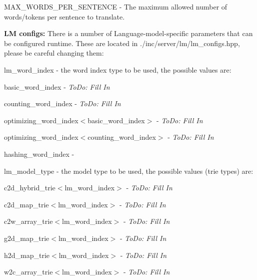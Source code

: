 \begin{DoxyItemize}
\item {\ttfamily M\+A\+X\+\_\+\+W\+O\+R\+D\+S\+\_\+\+P\+E\+R\+\_\+\+S\+E\+N\+T\+E\+N\+C\+E} -\/ The maximum allowed number of words/tokens per sentence to translate.
\end{DoxyItemize}

{\bfseries L\+M configs\+:} There is a number of Language-\/model-\/specific parameters that can be configured runtime. These are located in {\ttfamily ./inc/server/lm/lm\+\_\+configs.hpp}, please be careful changing them\+:


\begin{DoxyItemize}
\item {\ttfamily lm\+\_\+word\+\_\+index} -\/ the word index type to be used, the possible values are\+:
\begin{DoxyItemize}
\item {\ttfamily basic\+\_\+word\+\_\+index} -\/ {\itshape To\+Do\+: Fill In}
\item {\ttfamily counting\+\_\+word\+\_\+index} -\/ {\itshape To\+Do\+: Fill In}
\item {\ttfamily optimizing\+\_\+word\+\_\+index$<$basic\+\_\+word\+\_\+index$>$} -\/ {\itshape To\+Do\+: Fill In}
\item {\ttfamily optimizing\+\_\+word\+\_\+index$<$counting\+\_\+word\+\_\+index$>$} -\/ {\itshape To\+Do\+: Fill In}
\item {\ttfamily hashing\+\_\+word\+\_\+index} -\/
\end{DoxyItemize}
\item {\ttfamily lm\+\_\+model\+\_\+type} -\/ the model type to be used, the possible values (trie types) are\+:
\begin{DoxyItemize}
\item {\ttfamily c2d\+\_\+hybrid\+\_\+trie$<$lm\+\_\+word\+\_\+index$>$} -\/ {\itshape To\+Do\+: Fill In}
\item {\ttfamily c2d\+\_\+map\+\_\+trie$<$lm\+\_\+word\+\_\+index$>$} -\/ {\itshape To\+Do\+: Fill In}
\item {\ttfamily c2w\+\_\+array\+\_\+trie$<$lm\+\_\+word\+\_\+index$>$} -\/ {\itshape To\+Do\+: Fill In}
\item {\ttfamily g2d\+\_\+map\+\_\+trie$<$lm\+\_\+word\+\_\+index$>$} -\/ {\itshape To\+Do\+: Fill In}
\item {\ttfamily h2d\+\_\+map\+\_\+trie$<$lm\+\_\+word\+\_\+index$>$} -\/ {\itshape To\+Do\+: Fill In}
\item {\ttfamily w2c\+\_\+array\+\_\+trie$<$lm\+\_\+word\+\_\+index$>$} -\/ {\itshape To\+Do\+: Fill In}

\end{DoxyItemize}
\end{DoxyItemize}
